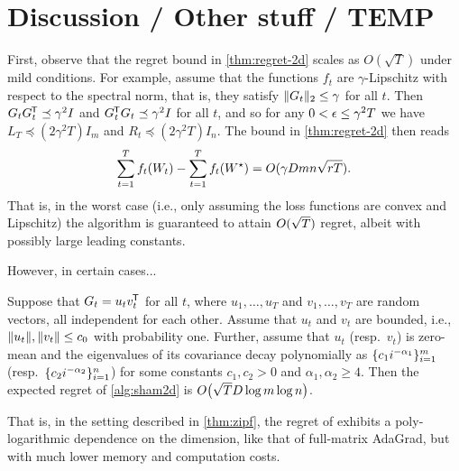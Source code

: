 \section{Discussion / Other stuff / TEMP}

First, observe that the regret bound in \cref{thm:regret-2d} scales as $O(\sqrt{T})$ under mild conditions.
For example, assume that the functions $f_t$ are $\gamma$-Lipschitz with respect to the spectral norm, that is, they satisfy $\|G_t\|_2 \le \gamma$ for all $t$.
Then $G_t G_t^{\mkern-1.5mu\scriptstyle\mathsf{T}} \preceq \gamma^2 I$ and $G_t^{\mkern-1.5mu\scriptstyle\mathsf{T}} G_t \preceq \gamma^2 I$ for all $t$, and so for any $0 < \epsilon \le \gamma^2 T$ we have
$L_T \preceq (2\gamma^2 T) I_m$ and $R_t \preceq (2\gamma^2 T) I_n$.
The bound in \cref{thm:regret-2d} then reads
\begin{align*}
\sum_{t=1}^T f_t(W_t) - \sum_{t=1}^T f_t(W^\star)
=
O(\gamma D mn \sqrt{rT})
.
\end{align*}
That is, in the worst case (i.e., only assuming the loss functions are convex and Lipschitz) the algorithm is guaranteed to attain $O(\sqrt{T})$ regret, albeit with possibly large leading constants.

However, in certain cases...

\begin{theorem} \label{thm:zipf}
Suppose that $G_t = u_t v_t^{\mkern-1.5mu\scriptstyle\mathsf{T}}$ for all $t$, where $u_1,\ldots,u_T$ and $v_1,\ldots,v_T$ are random vectors, all independent for each other.
Assume that $u_t$ and $v_t$ are bounded, i.e., $\|u_t\|, \|v_t\| \le c_0$ with probability one.
Further, assume that $u_t$ (resp.~$v_t$) is zero-mean and the eigenvalues of its covariance decay polynomially as $\{c_1 i^{-\alpha_1}\}_{i=1}^m$ (resp.~$\{c_2 i^{-\alpha_2}\}_{i=1}^n$) for some constants $c_1,c_2 > 0$ and $\alpha_1,\alpha_2 \ge 4$.
Then the expected regret of \cref{alg:sham2d} is $O\mathopen{}\big( \sqrt{T} D \log{m} \log{n} \big)$.
\end{theorem}

That is, in the setting described in \cref{thm:zipf}, the regret of \NAME exhibits a poly-logarithmic dependence on the dimension, like that of full-matrix AdaGrad, but with much lower memory and computation costs.


